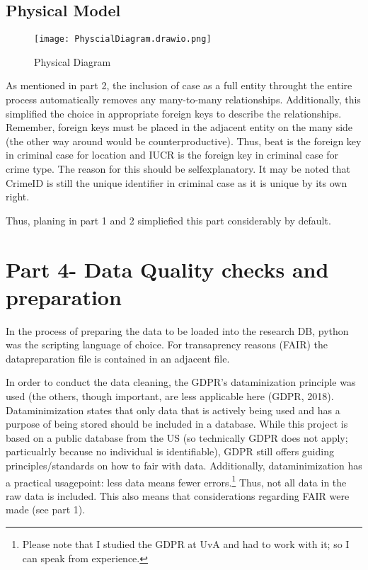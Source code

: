 \documentclass[a4paper]{article}
\begin{document}
\subsection{Physical Model}


\begin{figure}[htp]
		\centering
			\texttt{[image: PhyscialDiagram.drawio.png]}
         \small
         \caption{Physical Diagram}
\end{figure}

As mentioned in part 2, the inclusion of case as a full entity throught the entire process automatically removes any many-to-many relationships. Additionally, this simplified the choice in appropriate foreign keys to describe the relationships. Remember, foreign keys must be placed in the adjacent entity on the many side (the other way around would be counterproductive). Thus, beat is the foreign key in criminal case for location and IUCR is the foreign key in criminal case for crime type. The reason for this should be selfexplanatory. It may be noted that CrimeID is still the unique identifier in criminal case as it is unique by its own right. 

Thus, planing in part 1 and 2 simpliefied this part considerably by default. 


\section{Part 4- Data Quality checks and preparation}

In the process of preparing the data to be loaded into the research DB, python was the scripting language of choice. For transaprency reasons (FAIR) the datapreparation file is contained in an adjacent file. 

In order to conduct the data cleaning, the GDPR's dataminization principle was used (the others, though important, are less applicable here (GDPR, 2018). Dataminimization states that only data that is actively being used and has a purpose of being stored should be included in a database. While this project is based on a public database from the US (so technically GDPR does not apply; particualrly because no individual is identifiable), GDPR still offers guiding principles/standards on how to fair with data. Additionally, dataminimization has a practical usagepoint: less data means fewer errors.\footnote{Please note that I studied the GDPR at UvA and had to work with it; so I can speak from experience.} Thus, not all data in the raw data is included. This also means that considerations regarding FAIR were made (see part 1).  
\end{document}
